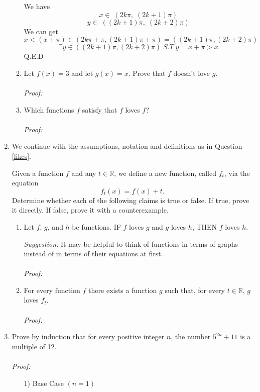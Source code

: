 \documentclass[12pt]{exam}
\newcommand {\DS} [1] {${\displaystyle #1}$}
\newcommand{\vv}{\vspace{.2cm}}
\newcommand{\R}{\mathbb{R}}
\begin{document}
\begin{enumerate}
\begin{enumerate}
		We have 
		$$
			x \in \; (2k\pi, \; (2k + 1)\pi)
		$$
		$$
			y \in \; ((2k + 1)\pi, \; (2k + 2)\pi)
		$$
		We can get
		$$
		x < (x + \pi) \in (2k\pi + \pi, (2k + 1)\pi + \pi) = ((2k + 1)\pi, (2k + 2)\pi)
		$$
		$$
		\exists y \in ((2k + 1)\pi, (2k + 2) \pi) \; S.T \; y=x + \pi > x
		$$
		Q.E.D

		\newpage
		\item  Let \DS{f(x) = 3} and let \DS{g(x) = x}.  Prove that $f$ doesn't love $g$.
		\\
		\\
		\emph{Proof:}
		\vv
		\newpage
		
		\item  Which functions $f$ satisfy that $f$ loves $f$? 
		\\
		\\
		\emph{Proof:}
		\newpage
		\
	\end{enumerate}
\vv

\item We continue with the assumptions, notation and definitions as in Question \ref{likes}.
	
	Given a function $f$ and any $t \in \R$, we define a new function, called $f_t$, via the equation
	$$
		f_t(x) = f(x) + t.
	$$
	Determine whether each of the following claims is true or false.  If true, prove it directly.  If false, prove it with a counterexample.
	\begin{enumerate}
		\item  Let $f$, $g$, and $h$ be functions. 
				IF $f$ loves $g$ and $g$ loves $h$,
				THEN $f$ loves $h$.
			
			\vv
			\emph{Suggestion:}  It may be helpful to think of functions in terms of graphs instead of in terms of their equations at first.
			\vv
		\\
		\\
		\emph{Proof:}
		
		\newpage	
		\item 
				For every function $f$ there exists a function $g$ such that, for every $t \in \R$, $g$ loves $f_t$.
		\\
		\\
		\emph{Proof:}
		
	\end{enumerate}

\vv

\newpage
\item Prove by induction that for every positive integer $n$, the number \DS{5^{2n}+11} is a multiple of 12.
\\
\\
\emph{Proof:}
	\begin{enumerate}
        \item[1)]Base Case $(n=1)$


\end{enumerate}
\end{enumerate}
\end{document}

